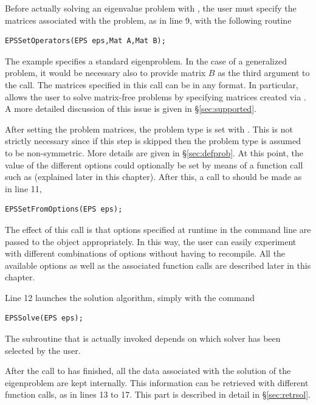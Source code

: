 Before actually solving an eigenvalue problem with , the user must specify the matrices associated with the problem, as in line 9, with the following routine
        \begin{Verbatim}[fontsize=\small]
        EPSSetOperators(EPS eps,Mat A,Mat B);
        \end{Verbatim}
The example specifies a standard eigenproblem. In the case of a generalized problem, it would be necessary also to provide matrix $B$ as the third argument to the call. The matrices specified in this call can be in any \petsc format. In particular,  allows the user to solve matrix-free problems by specifying matrices created via . A more detailed discussion of this issue is given in \S\ref{sec:supported}.

After setting the problem matrices, the problem type is set with . This is not strictly necessary since if this step is skipped then the problem type is assumed to be non-symmetric. More details are given in \S\ref{sec:defprob}.
At this point, the value of the different options could optionally be set by means of a function call such as  (explained later in this chapter). After this, a call to  should be made as in line 11,
        \begin{Verbatim}[fontsize=\small]
        EPSSetFromOptions(EPS eps);
        \end{Verbatim}
The effect of this call is that options specified at runtime in the command line are passed to the  object appropriately. In this way, the user can easily experiment with different combinations of options without having to recompile. All the available options as well as the associated function calls are described later in this chapter.

Line 12 launches the solution algorithm, simply with the command
        \begin{Verbatim}[fontsize=\small]
        EPSSolve(EPS eps);
        \end{Verbatim}
The subroutine that is actually invoked depends on which solver has been selected by the user.

        After the call to  has finished, all the data associated with the solution of the eigenproblem are kept internally. This information can be retrieved with different function calls, as in lines 13 to 17. This part is described in detail in \S\ref{sec:retrsol}.

